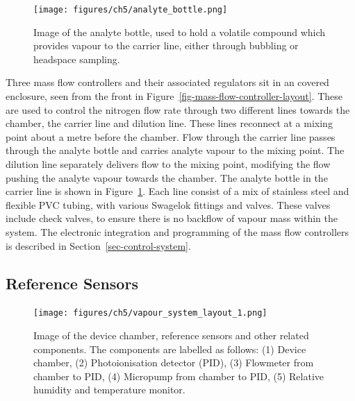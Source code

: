 \documentclass[
  a4paper,
]{scrbook}
\begin{document}
\begin{figure}

{\centering \texttt{[image: figures/ch5/analyte\_bottle.png]}

}

\caption{\label{fig-analyte-bottle}Image of the analyte bottle, used to
hold a volatile compound which provides vapour to the carrier line,
either through bubbling or headspace sampling.}

\end{figure}

Three mass flow controllers and their associated regulators sit in an
covered enclosure, seen from the front in
Figure~\ref{fig-mass-flow-controller-layout}. These are used to control
the nitrogen flow rate through two different lines towards the chamber,
the carrier line and dilution line. These lines reconnect at a mixing
point about a metre before the chamber. Flow through the carrier line
passes through the analyte bottle and carries analyte vapour to the
mixing point. The dilution line separately delivers flow to the mixing
point, modifying the flow pushing the analyte vapour towards the
chamber. The analyte bottle in the carrier line is shown in
Figure~\ref{fig-analyte-bottle}. Each line consist of a mix of stainless
steel and flexible PVC tubing, with various Swagelok fittings and
valves. These valves include check valves, to ensure there is no
backflow of vapour mass within the system. The electronic integration
and programming of the mass flow controllers is described in
Section~\ref{sec-control-system}.

\hypertarget{sec-reference-sensors}{%
\subsection{Reference Sensors}\label{sec-reference-sensors}}

\begin{figure}

{\centering \texttt{[image: figures/ch5/vapour\_system\_layout\_1.png]}

}

\caption{\label{fig-reference-sensor-layout}Image of the device chamber,
reference sensors and other related components. The components are
labelled as follows: (1) Device chamber, (2) Photoionisation detector
(PID), (3) Flowmeter from chamber to PID, (4) Micropump from chamber to
PID, (5) Relative humidity and temperature monitor.}

\end{figure}
\end{document}
